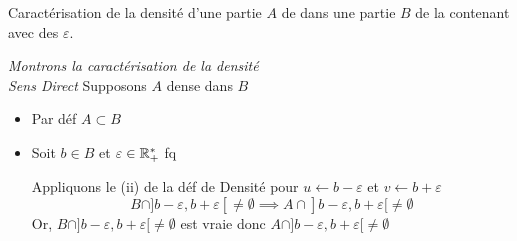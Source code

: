 \documentclass{article}
\date{3 décembre 2023}
\begin{document}
\maketitle

	{Caractérisation de la densité d’une partie $A$ de \R dans une partie $B$ de \R la contenant avec des $\varepsilon$.}

	\textit{Montrons la caractérisation de la densité}\\
	\emph{Sens Direct} Supposons $A$ dense dans $B$
	\begin{itemize}[label=\textemdash]
		\item Par déf $A \subset B$
		\item Soit $b \in B$ et $\varepsilon \in \mathbb R_+^*$ fq

		      Appliquons le (ii) de la déf de Densité pour $u \leftarrow b - \varepsilon$ et $v \leftarrow b + \varepsilon$
		      $$B \cap ]b - \varepsilon, b + \varepsilon[ \neq \emptyset \implies A \cap ]b - \varepsilon,  b + \varepsilon[ \neq \emptyset$$
			      Or, $B \cap ]b - \varepsilon, b + \varepsilon[ \neq \emptyset$ est vraie
				      donc $A \cap ]b - \varepsilon,  b + \varepsilon[ \neq \emptyset$


\end{itemize}
\end{question_kholle}
\end{document}
